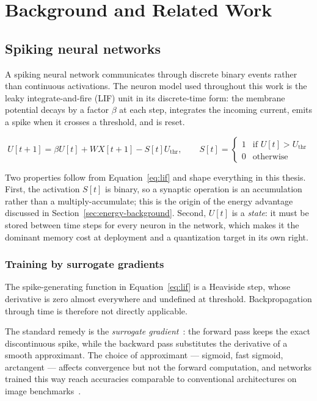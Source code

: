 \chapter{Background and Related Work}
\label{ch:background}

\section{Spiking neural networks}

A spiking neural network communicates through discrete binary events rather than
continuous activations. The neuron model used throughout this work is the leaky
integrate-and-fire (LIF) unit in its discrete-time form: the membrane potential
decays by a factor $\beta$ at each step, integrates the incoming current, emits a
spike when it crosses a threshold, and is reset.

\begin{equation}
U[t+1] = \beta U[t] + W X[t+1] - S[t] U_{\text{thr}},
\qquad
S[t] = \begin{cases}
1 & \text{if } U[t] > U_{\text{thr}} \\
0 & \text{otherwise}
\end{cases}
\label{eq:lif}
\end{equation}

Two properties follow from Equation~\ref{eq:lif} and shape everything in this
thesis. First, the activation $S[t]$ is binary, so a synaptic operation is an
accumulation rather than a multiply-accumulate; this is the origin of the energy
advantage discussed in Section~\ref{sec:energy-background}. Second, $U[t]$ is a
\emph{state}: it must be stored between time steps for every neuron in the
network, which makes it the dominant memory cost at deployment and a
quantization target in its own right.

\subsection{Training by surrogate gradients}

The spike-generating function in Equation~\ref{eq:lif} is a Heaviside step, whose
derivative is zero almost everywhere and undefined at threshold. Backpropagation
through time is therefore not directly applicable.

The standard remedy is the \emph{surrogate gradient}~\cite{neftci2019surrogate}:
the forward pass keeps the exact discontinuous spike, while the backward pass
substitutes the derivative of a smooth approximant. The choice of approximant
--- sigmoid, fast sigmoid, arctangent --- affects convergence but not the
forward computation, and networks trained this way reach accuracies comparable
to conventional architectures on image benchmarks~\cite{eshraghian2023}.

